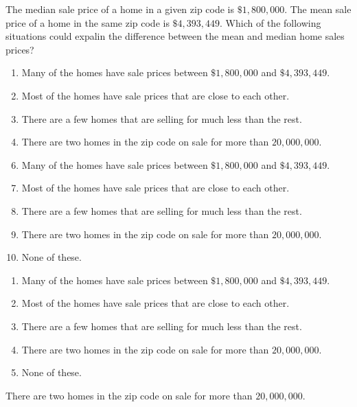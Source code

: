  
The median sale price of a home in a given zip code is $\$1,800,000$.  The mean sale price of a home in the same zip code is $\$4,393,449$.  Which of the following situations could expalin the difference between the mean and median home sales prices?


\ifsat
	\begin{enumerate}[label=\Alph*)]
		\item Many of the homes have sale prices between $\$1,800,000$ and $\$4,393,449$. 
		\item Most of the homes have sale prices that are close to each other.
		\item There are a few homes that are selling for much less than the rest. 
		\item There are two homes in the zip code on sale for more than $20,000,000$. %
	\end{enumerate}
\else
\fi

\ifacteven
	\begin{enumerate}[label=\textbf{\Alph*.},itemsep=\fill,align=left]
		\setcounter{enumii}{5}
		\item Many of the homes have sale prices between $\$1,800,000$ and $\$4,393,449$. 
		\item Most of the homes have sale prices that are close to each other.
		\item There are a few homes that are selling for much less than the rest. 
		\addtocounter{enumii}{1}
		\item There are two homes in the zip code on sale for more than $20,000,000$. %
		\item None of these. 
	\end{enumerate}
\else
\fi

\ifactodd
	\begin{enumerate}[label=\textbf{\Alph*.},itemsep=\fill,align=left]
		\item Many of the homes have sale prices between $\$1,800,000$ and $\$4,393,449$. 
		\item Most of the homes have sale prices that are close to each other.
		\item There are a few homes that are selling for much less than the rest. 
		\item There are two homes in the zip code on sale for more than $20,000,000$. %
		\item None of these. 
	\end{enumerate}
\else
\fi

\ifgridin
 There are two homes in the zip code on sale for more than $20,000,000$. %

\else
\fi

